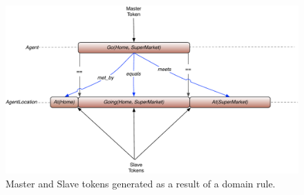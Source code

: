 \begin{description}
  \begin{figure}[t]
    \centering
    \includegraphics[scale=0.45]{figs/europa-pr-rules.pdf}
    \caption{\small Master and Slave tokens generated as a result of a domain rule.}
    \label{fig:europapr:rules}
  \end{figure}

\end{description}

